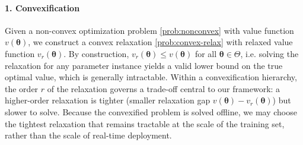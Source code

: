 \documentclass[10pt]{article} %
\theoremstyle{plain}
\theoremstyle{definition}
\theoremstyle{remark}
\begin{document}



\paragraph{1. Convexification} Given a non-convex optimization problem \cref{prob:nonconvex}{}{} with value function $v(\bm{\theta})$, we construct a convex relaxation \cref{prob:convex-relax}{}{} with relaxed value function $v_r(\bm{\theta}).$
By construction, $v_r(\bm{\theta}) \leq v(\bm{\theta})$ for all $\bm{\theta} \in \Theta$, i.e. solving the relaxation for any parameter instance yields a valid lower bound on the true optimal value, which is generally intractable.
Within a convexification hierarchy, the order $r$ of the relaxation governs a trade-off central to our framework: a higher-order relaxation is tighter (smaller relaxation gap $v(\bm{\theta}) - v_r(\bm{\theta})$) but slower to solve. Because the convexified problem is solved offline, we may choose the tightest relaxation that remains tractable at the scale of the training set, rather than the scale of real-time deployment.
\end{document}
